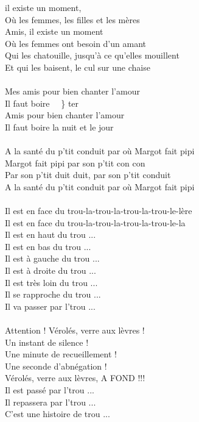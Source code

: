 
\vspace{-0.3cm}
 il existe un moment,
\\Où les femmes, les filles et les mères 
\\Amis, il existe un moment
\\Où les femmes ont besoin d'un amant
\\Qui les chatouille, jusqu'à ce qu'elles mouillent 
\\Et qui les baisent, le cul sur une chaise
\\\\Mes amis pour bien chanter l'amour 
\\Il faut boire ~~\} ter
\\Amis pour bien chanter l'amour 
\\Il faut boire la nuit et le jour
\\\\A la santé du p'tit conduit par où Margot fait pipi 
\\Margot fait pipi par son p'tit con con
\\Par son p'tit duit duit, par son p'tit conduit
\\A la santé du p'tit conduit par où Margot fait pipi
\\\\Il est en face du trou-la-trou-la-trou-la-trou-le-lère
\\Il est en face du trou-la-trou-la-trou-la-trou-le-la
\\Il est en haut du trou ...
\\Il est en bas du trou ...
\\Il est à gauche du trou ... 
\\Il est à droite du trou ...
\\Il est très loin du trou ... 
\\Il se rapproche du trou ... 
\\Il va passer par l'trou ...
\\\\Attention ! Vérolés, verre aux lèvres ! 
\\Un instant de silence ! 
\\Une minute de recueillement ! 
\\Une seconde d'abnégation !
\\Vérolés, verre aux lèvres, A FOND !!!
\\Il est passé par l'trou ... 
\\Il repassera par l'trou ...
\\C'est une histoire de trou ...

\breakpage